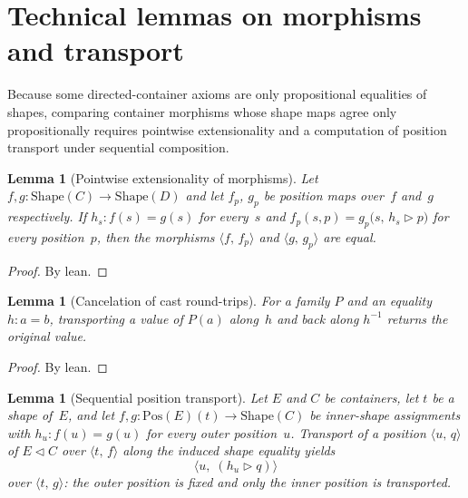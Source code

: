 \documentclass[11pt,a4paper]{article}
\theoremstyle{plain}
\newtheorem{lemma}[theorem]{Lemma}
\theoremstyle{definition}
\newcommand{\Shape}{\mathrm{Shape}}
\newcommand{\Pos}{\mathrm{Pos}}
\begin{document}
\section{Technical lemmas on morphisms and transport}

Because some directed-container axioms are only propositional equalities of
shapes, comparing container morphisms whose shape maps agree only
propositionally requires pointwise extensionality and a computation of
position transport under sequential composition.

\begin{lemma}[Pointwise extensionality of morphisms]\label{lem:ext-eq}
Let $f,g : \Shape(C) \to \Shape(D)$ and let $f_p$, $g_p$ be position maps
over~$f$ and~$g$ respectively. If $h_s : f(s) = g(s)$ for every~$s$ and
$f_p(s,p) = g_p\bigl(s,\, h_s \mathbin{\triangleright} p\bigr)$ for every
position~$p$, then the morphisms $\langle f,\, f_p\rangle$ and
$\langle g,\, g_p\rangle$ are equal.
\end{lemma}

\begin{proof}
By lean.
\end{proof}

\begin{lemma}[Cancelation of cast round-trips]\label{lem:cast-symm}
For a family $P$ and an equality $h : a = b$, transporting a value of
$P(a)$ along~$h$ and back along $h^{-1}$ returns the original value.
\end{lemma}

\begin{proof}
By lean.
\end{proof}

\begin{lemma}[Sequential position transport]\label{lem:seq-pos-transport}
Let $E$ and $C$ be containers, let $t$ be a shape of~$E$, and let
$f,g : \Pos(E)(t) \to \Shape(C)$ be inner-shape assignments with
$h_u : f(u) = g(u)$ for every outer position~$u$. Transport of a position
$\langle u,\, q\rangle$ of $E \mathbin{\triangleleft} C$ over
$\langle t,\, f\rangle$ along the induced shape equality yields
\begin{equation}
  \bigl\langle u,\;
    (h_u \mathbin{\triangleright} q) \bigr\rangle
\end{equation}
over $\langle t,\, g\rangle$: the outer position is fixed and only the inner
position is transported.
\end{lemma}
\end{document}
